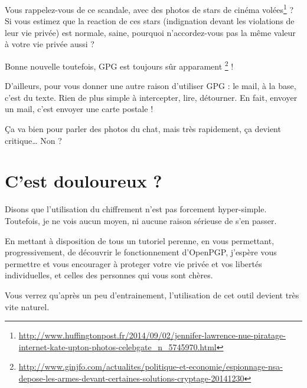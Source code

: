 Vous rappelez-vous de ce scandale, avec des photos de stars de cinéma volées\footnote{\url{http://www.huffingtonpost.fr/2014/09/02/jennifer-lawrence-nue-piratage-internet-kate-upton-photos-celebgate_n_5745970.html}} ?\\Si vous estimez que la reaction de ces stars (indignation devant les violations de leur vie privée) est
normale, saine, pourquoi n'accordez-vous pas la même valeur à votre vie privée aussi ?

Bonne nouvelle toutefois, GPG est toujours sûr apparament
\footnote{\url{http://www.ginjfo.com/actualites/politique-et-economie/espionnage-nsa-depose-les-armes-devant-certaines-solutions-cryptage-20141230}} !

D'ailleurs, pour vous donner une autre raison d'utiliser GPG : le mail, à la base, c'est du texte. Rien de plus simple à intercepter, lire,
détourner. En fait, envoyer un mail, c'est envoyer une carte postale !

Ça va bien pour parler des photos du chat, mais très rapidement, ça
devient critique\ldots{} Non ?

\section{C'est douloureux ?}\label{cest-douloureux}

Disons que l'utilisation du chiffrement n'est pas forcement hyper-simple. Toutefois, je ne vois aucun moyen, ni
aucune raison sérieuse de s'en passer.

En mettant à disposition de tous un tutoriel perenne, en vous
permettant, progressivement, de découvrir le fonctionnement d'OpenPGP,
j'espère vous permettre et vous encourager à proteger votre vie privée
et vos libertés individuelles, et celles des personnes qui vous sont
chères.

Vous verrez qu'après un peu d'entrainement, l'utilisation de cet outil
devient très vite naturel.
